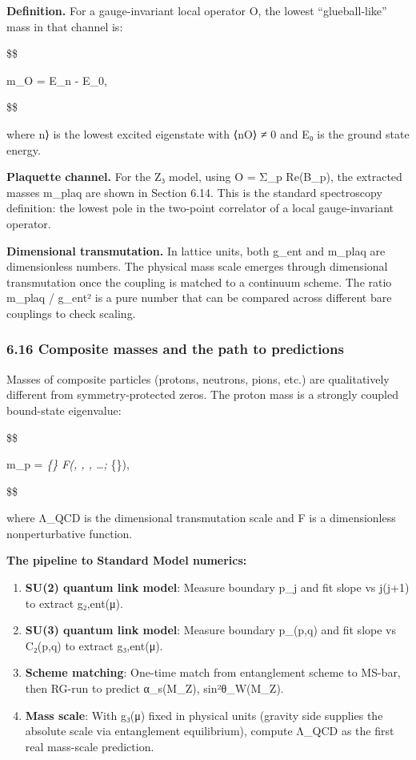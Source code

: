\documentclass[11pt,a4paper]{article}
\theoremstyle{remark}
\begin{document}
\textbf{Definition.} For a gauge-invariant local operator O, the lowest
``glueball-like'' mass in that channel is:

\$\$

m\_O = E\_n - E\_0,

\$\$

where \textbar n⟩ is the lowest excited eigenstate with ⟨n\textbar O⟩ ≠ 0
and E₀ is the ground state energy.

\textbf{Plaquette channel.} For the Z₃ model, using
O = Σ\_p Re(B\_p), the extracted masses m\_plaq are
shown in Section 6.14. This is the standard spectroscopy definition: the lowest
pole in the two-point correlator of a local gauge-invariant operator.

\textbf{Dimensional transmutation.} In lattice units, both g\_ent and
m\_plaq are dimensionless numbers. The physical mass scale emerges
through dimensional transmutation once the coupling is matched to a continuum
scheme. The ratio m\_plaq / g\_ent² is a pure number
that can be compared across different bare couplings to check scaling.

\subsubsection{6.16 Composite masses and the path to predictions}\label{composite-masses-and-the-path-to-predictions}

Masses of composite particles (protons, neutrons, pions, etc.) are
qualitatively different from symmetry-protected zeros. The proton mass is a
strongly coupled bound-state eigenvalue:

\$\$

m\_p = \Lambda\emph{\{\} \cdot F\left(,
, , \ldots;
\alpha}\{\}\right),

\$\$

where Λ\_QCD is the dimensional transmutation scale and F is a
dimensionless nonperturbative function.

\textbf{The pipeline to Standard Model numerics:}

\begin{enumerate}
\def\labelenumi{\arabic{enumi}.}
\item
  \textbf{SU(2) quantum link model}: Measure boundary p\_j and fit slope
  vs j(j+1) to extract g₂,ent(μ).
\item
  \textbf{SU(3) quantum link model}: Measure boundary p\_(p,q) and fit
  slope vs C₂(p,q) to extract g₃,ent(μ).
\item
  \textbf{Scheme matching}: One-time match from entanglement scheme to
  MS-bar, then RG-run to predict α\_s(M\_Z), sin²θ\_W(M\_Z).
\item
  \textbf{Mass scale}: With g₃(μ) fixed in physical units (gravity side
  supplies the absolute scale via entanglement equilibrium), compute
  Λ\_QCD as the first real mass-scale prediction.
\end{enumerate}
\end{document}
